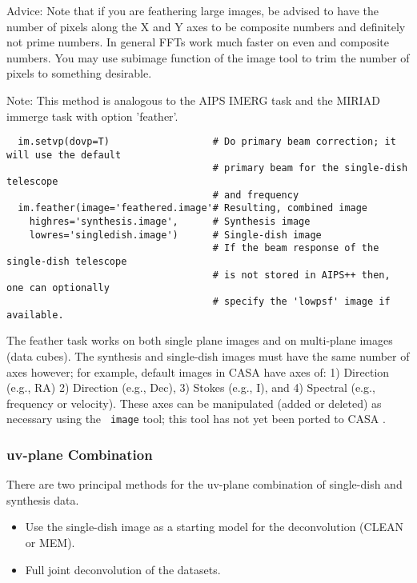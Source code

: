 Advice: Note that if you are feathering large images, be advised to
have the number of pixels along the X and Y axes to be composite
numbers and definitely not prime numbers. In general FFTs work much
faster on even and composite numbers. You may use subimage function of
the image tool to trim the number of pixels to something desirable.

Note: This method is analogous to the AIPS IMERG task and the MIRIAD
immerge task with option 'feather'.

\vspace{3mm}

\small
\begin{verbatim}
  im.setvp(dovp=T)                  # Do primary beam correction; it will use the default
                                    # primary beam for the single-dish telescope
                                    # and frequency
  im.feather(image='feathered.image'# Resulting, combined image
    highres='synthesis.image',      # Synthesis image
    lowres='singledish.image')      # Single-dish image
                                    # If the beam response of the single-dish telescope
                                    # is not stored in AIPS++ then, one can optionally
                                    # specify the 'lowpsf' image if  available.
\end{verbatim}
\normalsize

The feather task works on both single plane images and on multi-plane
images (data cubes).  The synthesis and single-dish images must have
the same number of axes however; for example, default images in CASA
have axes of: 1) Direction (e.g., RA) 2) Direction (e.g., Dec), 3)
Stokes (e.g., I), and 4) Spectral (e.g., frequency or velocity). These
axes can be manipulated (added or deleted) as necessary using the {\tt
image} tool; this tool has not yet been ported to CASA .

\subsubsection{uv-plane Combination}
\label{subsubsection:synth.im.uvCombo}

There are two principal methods for the uv-plane combination of
single-dish and synthesis data. 

\begin{itemize}
\item Use the single-dish image as a starting model for the
      deconvolution (CLEAN or MEM).
\item Full joint deconvolution of the datasets.
\end{itemize}

